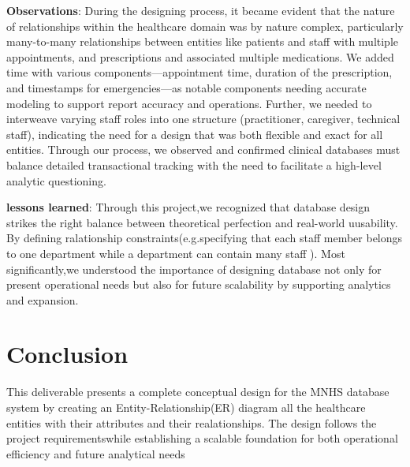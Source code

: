 \documentclass[a4paper,12pt]{article}
\begin{document}
\textbf{Observations}:
During the designing process, it became evident that the nature of relationships within the healthcare domain was by nature complex, particularly many-to-many relationships between entities like patients and staff with multiple appointments, and prescriptions and associated multiple medications. We added time with various components—appointment time, duration of the prescription, and timestamps for emergencies—as notable components needing accurate modeling to support report accuracy and operations. Further, we needed to interweave varying staff roles into one structure (practitioner, caregiver, technical staff), indicating the need for a design that was both flexible and exact for all entities. Through our process, we observed and confirmed clinical databases must balance detailed transactional tracking with the need to facilitate a high-level analytic questioning.

\textbf{lessons learned}:
Through this project,we recognized that database design strikes the right balance between theoretical perfection and real-world uusability.
By defining ralationship constraints(e.g.specifying that each staff member belongs to one department while a department can contain many staff ).
Most significantly,we understood the importance of designing database not only for present operational needs but also for future scalability by supporting analytics and expansion.

\section{Conclusion}
This deliverable presents a complete conceptual design for the MNHS database system by creating an Entity-Relationship(ER) diagram all the healthcare entities with their attributes and their realationships.
The design follows the project requirementswhile establishing a scalable foundation for both
operational efficiency and future analytical needs
\end{document}
